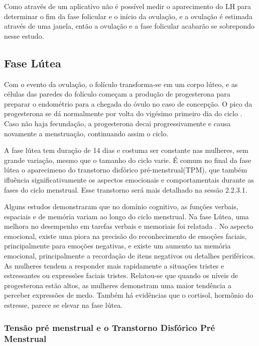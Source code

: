 Como através de um aplicativo não é possível medir o aparecimento do LH 
para determinar o fim da fase folicular e o início da ovulação, 
e a ovulação é estimada através de uma janela, então a ovulação e a fase 
folicular acabarão se sobrepondo nesse estudo.

\subsection{Fase Lútea}

Com o evento da ovulação, o folículo transforma-se em um corpo lúteo, e as 
células das paredes do folículo começam a produção de progesterona para 
preparar o endométrio para a chegada do óvulo no caso de concepção. 
O pico da progesterona se dá normalmente por volta do vigésimo primeiro 
dia do ciclo \cite{nikas2003}. Caso não haja fecundação, a progesterona 
decai progressivamente e causa novamente a menstruação, continuando assim 
o ciclo.

A fase lútea tem duração de 14 dias e costuma ser constante nas mulheres, 
sem grande variação, mesmo que o tamanho do ciclo varie. É comum no final 
da fase lútea o aparecimeno do transtorno disfórico pré-menstrual(TPM), 
que também ifluência significativamente os aspectos emocionais e 
comportamentais durante as fases do ciclo menstrual. Esse transtorno 
será mais detalhado na sessão 2.2.3.1.

Alguns estudos demonstraram que no domínio cognitivo, as funções verbais, 
espaciais e de memória variam ao longo do ciclo menstrual. Na fase Lútea, 
uma melhora no desempenho em tarefas verbais e memoriais foi relatada 
\cite{hausmann2000}. No aspecto emocional, existe uma piora na precisão 
do reconhecimento de emoções faciais, principalmente para emoções negativas, 
e existe um aumento na memória emocional, principalmente a recordação de 
itens negativos ou detalhes periféricos. As mulheres tendem a responder 
mais rapidamente a situações tristes e estressantes ou expressões faciais 
tristes. Relatou-se que quando os níveis de progesterona estão altos, as 
mulheres demonstram uma maior tendência a perceber expressões de medo. 
Também há evidências que o cortisol, hormônio do estresse, parece se elevar 
na fase lútea\cite{kirschbaum1999}.

\subsubsection{Tensão pré menstrual e o Transtorno Disfórico Pré Menstrual}

